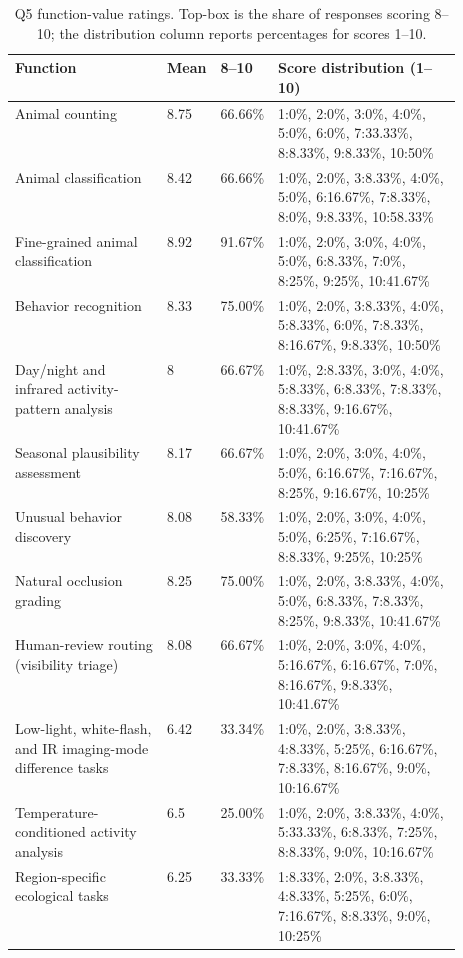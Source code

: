 \begin{table}[h]
\centering
\caption{Q5 function-value ratings. Top-box is the share of responses scoring 8--10; the distribution column reports percentages for scores 1--10.}
\label{tab:questionnaire_function_value}
\scriptsize
\setlength{\tabcolsep}{2.5pt}
\begin{tabularx}{\textwidth}{p{0.34\linewidth}p{0.08\linewidth}p{0.10\linewidth}X}
\toprule
Function & Mean & 8--10 & Score distribution (1--10) \\
\midrule
Animal counting & 8.75 & 66.66\% & 1:0\%, 2:0\%, 3:0\%, 4:0\%, 5:0\%, 6:0\%, 7:33.33\%, 8:8.33\%, 9:8.33\%, 10:50\% \\
Animal classification & 8.42 & 66.66\% & 1:0\%, 2:0\%, 3:8.33\%, 4:0\%, 5:0\%, 6:16.67\%, 7:8.33\%, 8:0\%, 9:8.33\%, 10:58.33\% \\
Fine-grained animal classification & 8.92 & 91.67\% & 1:0\%, 2:0\%, 3:0\%, 4:0\%, 5:0\%, 6:8.33\%, 7:0\%, 8:25\%, 9:25\%, 10:41.67\% \\
Behavior recognition & 8.33 & 75.00\% & 1:0\%, 2:0\%, 3:8.33\%, 4:0\%, 5:8.33\%, 6:0\%, 7:8.33\%, 8:16.67\%, 9:8.33\%, 10:50\% \\
Day/night and infrared activity-pattern analysis & 8 & 66.67\% & 1:0\%, 2:8.33\%, 3:0\%, 4:0\%, 5:8.33\%, 6:8.33\%, 7:8.33\%, 8:8.33\%, 9:16.67\%, 10:41.67\% \\
Seasonal plausibility assessment & 8.17 & 66.67\% & 1:0\%, 2:0\%, 3:0\%, 4:0\%, 5:0\%, 6:16.67\%, 7:16.67\%, 8:25\%, 9:16.67\%, 10:25\% \\
Unusual behavior discovery & 8.08 & 58.33\% & 1:0\%, 2:0\%, 3:0\%, 4:0\%, 5:0\%, 6:25\%, 7:16.67\%, 8:8.33\%, 9:25\%, 10:25\% \\
Natural occlusion grading & 8.25 & 75.00\% & 1:0\%, 2:0\%, 3:8.33\%, 4:0\%, 5:0\%, 6:8.33\%, 7:8.33\%, 8:25\%, 9:8.33\%, 10:41.67\% \\
Human-review routing (visibility triage) & 8.08 & 66.67\% & 1:0\%, 2:0\%, 3:0\%, 4:0\%, 5:16.67\%, 6:16.67\%, 7:0\%, 8:16.67\%, 9:8.33\%, 10:41.67\% \\
Low-light, white-flash, and IR imaging-mode difference tasks & 6.42 & 33.34\% & 1:0\%, 2:0\%, 3:8.33\%, 4:8.33\%, 5:25\%, 6:16.67\%, 7:8.33\%, 8:16.67\%, 9:0\%, 10:16.67\% \\
Temperature-conditioned activity analysis & 6.5 & 25.00\% & 1:0\%, 2:0\%, 3:8.33\%, 4:0\%, 5:33.33\%, 6:8.33\%, 7:25\%, 8:8.33\%, 9:0\%, 10:16.67\% \\
Region-specific ecological tasks & 6.25 & 33.33\% & 1:8.33\%, 2:0\%, 3:8.33\%, 4:8.33\%, 5:25\%, 6:0\%, 7:16.67\%, 8:8.33\%, 9:0\%, 10:25\% \\

\end{tabularx}
\end{table}
